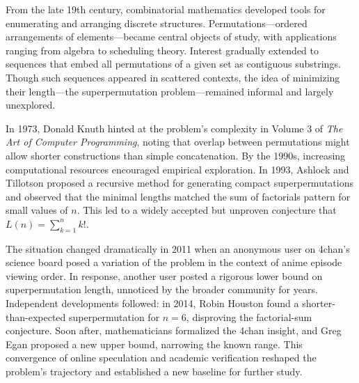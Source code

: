 \begin{historical}
From the late 19th century, combinatorial mathematics developed tools for enumerating and arranging discrete structures. Permutations—ordered arrangements of elements—became central objects of study, with applications ranging from algebra to scheduling theory. Interest gradually extended to sequences that embed all permutations of a given set as contiguous substrings. Though such sequences appeared in scattered contexts, the idea of minimizing their length—the superpermutation problem—remained informal and largely unexplored.

In 1973, Donald Knuth hinted at the problem's complexity in Volume 3 of \textit{The Art of Computer Programming}, noting that overlap between permutations might allow shorter constructions than simple concatenation. By the 1990s, increasing computational resources encouraged empirical exploration. In 1993, Ashlock and Tillotson proposed a recursive method for generating compact superpermutations and observed that the minimal lengths matched the sum of factorials pattern for small values of \( n \). This led to a widely accepted but unproven conjecture that \( L(n) = \sum_{k=1}^{n} k! \).

The situation changed dramatically in 2011 when an anonymous user on 4chan’s science board posed a variation of the problem in the context of anime episode viewing order. In response, another user posted a rigorous lower bound on superpermutation length, unnoticed by the broader community for years. Independent developments followed: in 2014, Robin Houston found a shorter-than-expected superpermutation for \( n = 6 \), disproving the factorial-sum conjecture. Soon after, mathematicians formalized the 4chan insight, and Greg Egan proposed a new upper bound, narrowing the known range. This convergence of online speculation and academic verification reshaped the problem’s trajectory and established a new baseline for further study.
\end{historical}
